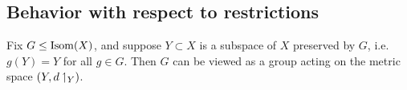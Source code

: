 



\subsection{Behavior with respect to restrictions}
Fix $G\leq\operatorname{Isom}(X)$, and suppose $Y\subset X$ is a subspace of $X$ preserved by $G$, i.e. $g(Y) = Y$ for all $g\in G$. Then $G$ can be viewed as a group acting on the metric space $(Y,d\upharpoonleft_Y)$.

